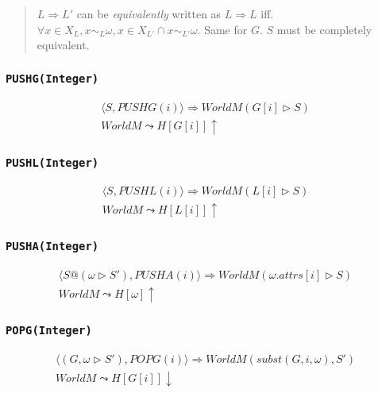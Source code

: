 \documentclass[]{article}
\numberwithin{equation}{section}
\numberwithin{figure}{section}
\numberwithin{table}{section}
\begin{document}
\begin{quote}

$L \Rightarrow L'$ can be \emph{equivalently} written as
$L \Rightarrow L$ iff.
$\forall x \in X_{L}, x \sim_L \omega, x \in X_{L'} \cap x \sim_{L'} \omega$.
Same for $G$. $S$ must be completely equivalent.

\end{quote}


\subsubsection{\texttt{PUSHG(Integer)}}\label{pushginteger}

\begin{gather*}
  \langle S, PUSHG(i)\rangle \Rightarrow WorldM (G[i] \rhd S)\\
  WorldM \leadsto H[G[i]] \uparrow
\end{gather*}

\subsubsection{\texttt{PUSHL(Integer)}}\label{pushlinteger}

\begin{gather*}
  \langle S, PUSHL(i)\rangle \Rightarrow WorldM (L[i] \rhd S )\\
  WorldM \leadsto H[L[i]] \uparrow
\end{gather*}

\subsubsection{\texttt{PUSHA(Integer)}}\label{pushainteger}

\begin{gather*}
  \langle S@(\omega \rhd S'), PUSHA(i)\rangle \Rightarrow WorldM (\omega.attrs[i] \rhd S )\\
  WorldM \leadsto H[\omega] \uparrow
\end{gather*}

\subsubsection{\texttt{POPG(Integer)}}\label{popginteger}

\begin{gather*}
  \langle (G, \omega \rhd S'), POPG(i)\rangle \Rightarrow WorldM (subst(G, i, \omega), S' )\\
  WorldM \leadsto H[G[i]] \downarrow
\end{gather*}
\end{document}
